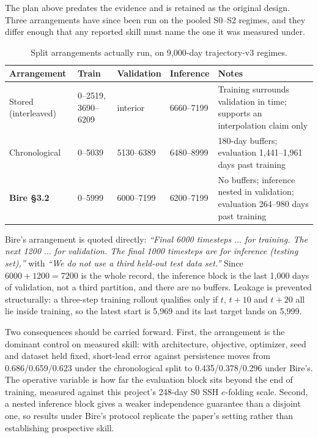 \documentclass[11pt]{article}
\begin{document}
The plan above predates the evidence and is retained as the original design.  Three
arrangements have since been run on the pooled S0--S2 regimes, and they differ enough
that any reported skill must name the one it was measured under.

\begin{table}[htbp]\centering\small
\caption{Split arrangements actually run, on 9,000-day trajectory-v3 regimes.}
\label{tab:realised-splits}
\begin{tabularx}{\textwidth}{@{}p{}p{}p{}p{}Y@{}}
\toprule
\textbf{Arrangement} & \textbf{Train} & \textbf{Validation} &
\textbf{Inference} & \textbf{Notes} \\
\midrule
Stored (interleaved) & 0--2519, 3690--6209 & interior & 6660--7199 &
Training surrounds validation in time; supports an interpolation claim only \\
Chronological & 0--5039 & 5130--6389 & 6480--8999 &
180-day buffers; evaluation 1,441--1,961 days past training \\
\textbf{Bire \S3.2} & 0--5999 & 6000--7199 & 6200--7199 &
No buffers; inference nested in validation; evaluation 264--980 days past training \\
\bottomrule
\end{tabularx}
\end{table}

Bire's arrangement is quoted directly: \emph{``Final 6000 timesteps \(\ldots\) for
training.  The next 1200 \(\ldots\) for validation.  The final 1000 timesteps are for
inference (testing set),''} with \emph{``We do not use a third held-out test data
set.''}  Since \(6000+1200=7200\) is the whole record, the inference block is the last
1,000 days of validation, not a third partition, and there are no buffers.  Leakage is
prevented structurally: a three-step training rollout qualifies only if \(t\), \(t+10\)
and \(t+20\) all lie inside training, so the latest start is 5,969 and its last target
lands on 5,999.

Two consequences should be carried forward.  First, the arrangement is the dominant
control on measured skill: with architecture, objective, optimizer, seed and dataset
held fixed, short-lead error against persistence moves from 0.686/0.659/0.623 under
the chronological split to 0.435/0.378/0.296 under Bire's.  The operative variable is
how far the evaluation block sits beyond the end of training, measured against this
project's 248-day S0 SSH \(e\)-folding scale.  Second, a nested inference block gives a
weaker independence guarantee than a disjoint one, so results under Bire's protocol
replicate the paper's setting rather than establishing prospective skill.
\end{document}
